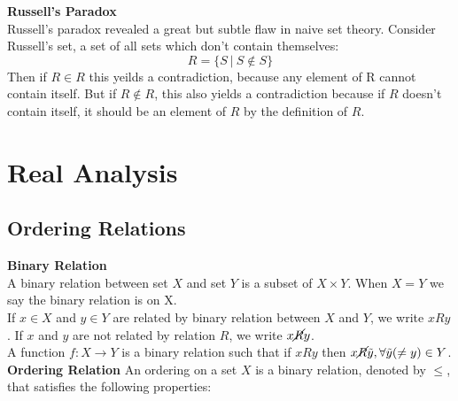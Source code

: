 \documentclass{article}
\numberwithin{theorem}{subsection}
\numberwithin{theorem}{subsubsection}
\theoremstyle{definition}
\numberwithin{definition}{subsection}
\numberwithin{definition}{subsubsection}
\begin{document}
\noindent \textbf{Russell's Paradox} \\
\indent Russell's paradox revealed a great but subtle flaw in naive set theory. Consider Russell's set, a set of all sets which don't contain themselves:
\begin{equation*}
    R = \{S\ |\ S \notin S\}
\end{equation*}
\noindent Then if $R \in R$ this yeilds a contradiction, because any element of R cannot contain itself. But if $R \notin R$, this also yields a contradiction because if $R$ doesn't contain itself, it should be an element of $R$ by the definition of $R$.

\begin{comment}
======================================================================================================================================================================================================================================================================================REAL ANALYSIS================================================ ====================================================================================================================================================================================================================================
\end{comment}

\section{Real Analysis}

\subsection{Ordering Relations}
\noindent \textbf{Binary Relation} \\
\indent A binary relation between set $X$ and set $Y$ is a subset of $X \times Y$. When $X = Y$ we say the binary relation is on X.
\\
\indent If $x \in X$ and $y \in Y$ are related by binary relation between $X$ and $Y$, we write $xRy$. If $x$ and $y$ are not related by relation $R$, we write $x\cancel{R}y$. \\
\indent A function $f: X \rightarrow Y$ is a binary relation such that if $xRy$ then $x\cancel{R}\Tilde{y}, \forall \Tilde{y}( \neq y) \in Y$.
\\

\noindent \textbf{Ordering Relation} An ordering on a set $X$ is a binary relation, denoted by $\leq$, that satisfies the following properties:
\end{document}
